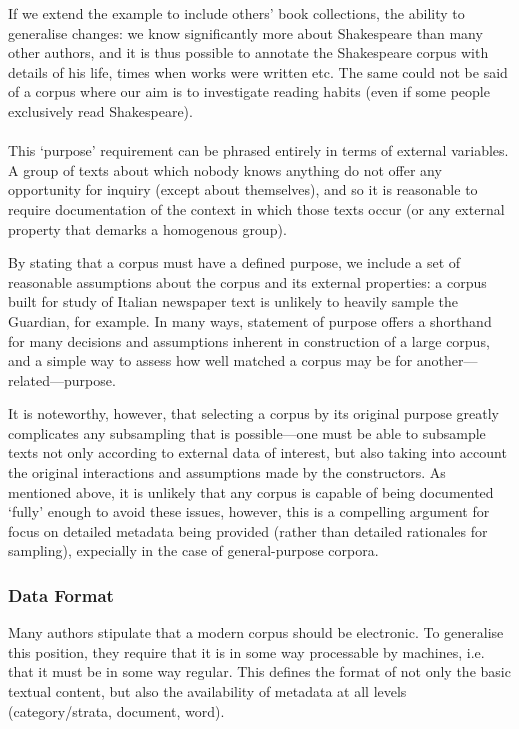 If we extend the example to include others' book collections, the ability to generalise changes: we know significantly more about Shakespeare than many other authors, and it is thus possible to annotate the Shakespeare corpus with details of his life, times when works were written etc.  The same could not be said of a corpus where our aim is to investigate reading habits (even if some people exclusively read Shakespeare).

\paragraph{}
This `purpose' requirement can be phrased entirely in terms of external variables.
A group of texts about which nobody knows anything do not offer any opportunity for inquiry (except about themselves), and so it is reasonable to require documentation of the context in which those texts occur (or any external property that demarks a homogenous group).

By stating that a corpus must have a defined purpose, we include a set of reasonable assumptions about the corpus and its external properties: a corpus built for study of Italian newspaper text is unlikely to heavily sample the Guardian, for example.  In many ways, statement of purpose offers a shorthand for many decisions and assumptions inherent in construction of a large corpus, and a simple way to assess how well matched a corpus may be for another---related---purpose.

It is noteworthy, however, that selecting a corpus by its original purpose greatly complicates any subsampling that is possible---one must be able to subsample texts not only according to external data of interest, but also taking into account the original interactions and assumptions made by the constructors.  As mentioned above, it is unlikely that any corpus is capable of being documented `fully' enough to avoid these issues, however, this is a compelling argument for focus on detailed metadata being provided (rather than detailed rationales for sampling), expecially in the case of general-purpose corpora.






\subsubsection{Data Format}
Many authors stipulate that a modern corpus should be electronic.  To generalise this position, they require that it is in some way processable by machines, i.e. that it must be in some way regular.
This defines the format of not only the basic textual content, but also the availability of metadata at all levels (category/strata, document, word).

